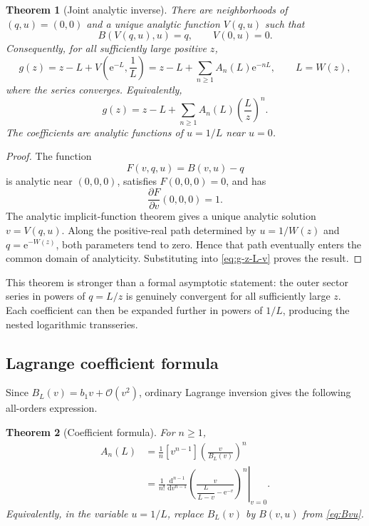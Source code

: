 \documentclass[11pt,a4paper]{article}
\numberwithin{equation}{section}
\newtheorem{theorem}{Theorem}[section]
\theoremstyle{definition}
\theoremstyle{remark}
\newcommand{\e}{\mathrm e}
\newcommand{\dd}{\,\mathrm d}
\newcommand{\Ord}{\mathcal O}
\newcommand{\Acoef}{A}
\begin{document}
\begin{theorem}[Joint analytic inverse]\label{thm:joint-analytic}
There are neighborhoods of \((q,u)=(0,0)\) and a unique analytic function
\(V(q,u)\) such that
\begin{equation}\label{eq:V-inverse}
  B(V(q,u),u)=q,
  \qquad V(0,u)=0.
\end{equation}
Consequently, for all sufficiently large positive \(z\),
\begin{equation}\label{eq:q-series-main}
  g(z)=z-L+V\!\left(\e^{-L},\frac1L\right)
      =z-L+\sum_{n\ge1}\Acoef_n(L)\e^{-nL},
  \qquad L=W(z),
\end{equation}
where the series converges.  Equivalently,
\begin{equation}\label{eq:q-series-L-over-z}
  g(z)=z-L+\sum_{n\ge1}\Acoef_n(L)
       \left(\frac{L}{z}\right)^n.
\end{equation}
The coefficients are analytic functions of \(u=1/L\) near \(u=0\).
\end{theorem}

\begin{proof}
The function
\[
  F(v,q,u)=B(v,u)-q
\]
is analytic near \((0,0,0)\), satisfies \(F(0,0,0)=0\), and has
\[
  \frac{\partial F}{\partial v}(0,0,0)=1.
\]
The analytic implicit-function theorem gives a unique analytic solution
\(v=V(q,u)\).  Along the positive-real path determined by
\(u=1/W(z)\) and \(q=\e^{-W(z)}\), both parameters tend to zero.  Hence
that path eventually enters the common domain of analyticity.  Substituting
into \eqref{eq:g-z-L-v} proves the result.
\end{proof}

This theorem is stronger than a formal asymptotic statement: the outer
sector series in powers of \(q=L/z\) is genuinely convergent for all
sufficiently large \(z\).  Each coefficient can then be expanded further
in powers of \(1/L\), producing the nested logarithmic transseries.

\subsection{Lagrange coefficient formula}

Since \(B_L(v)=b_1v+\Ord(v^2)\), ordinary Lagrange inversion gives the
following all-orders expression.

\begin{theorem}[Coefficient formula]\label{thm:A-Lagrange}
For \(n\ge1\),
\begin{align}
 \Acoef_n(L)
 &=\frac1n[v^{n-1}]
   \left(\frac{v}{B_L(v)}\right)^n
   \label{eq:A-coeff-extract}\\
 &=\frac1{n!}
   \left.\frac{\dd^{n-1}}{\dd v^{n-1}}
   \left(\frac{v}{\dfrac{L}{L-v}-\e^{-v}}\right)^n
   \right|_{v=0}.
   \label{eq:A-derivative}
\end{align}
Equivalently, in the variable \(u=1/L\), replace \(B_L(v)\) by
\(B(v,u)\) from \eqref{eq:Bvu}.
\end{theorem}
\end{document}
